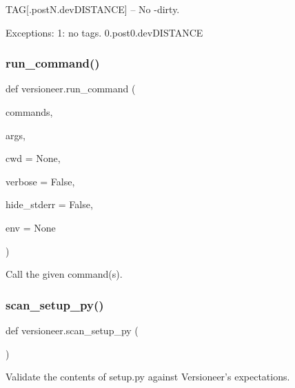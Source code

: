\begin{DoxyVerb}TAG[.postN.devDISTANCE] -- No -dirty.

Exceptions:
1: no tags. 0.post0.devDISTANCE
\end{DoxyVerb}
 \mbox{\label{namespaceversioneer_a89717690f70ee308e16baf071b4b81da}} 
\subsubsection{\texorpdfstring{run\+\_\+command()}{run\_command()}}
{\footnotesize\ttfamily def versioneer.\+run\+\_\+command (\begin{DoxyParamCaption}\item[{}]{commands,  }\item[{}]{args,  }\item[{}]{cwd = {\ttfamily None},  }\item[{}]{verbose = {\ttfamily False},  }\item[{}]{hide\+\_\+stderr = {\ttfamily False},  }\item[{}]{env = {\ttfamily None} }\end{DoxyParamCaption})}

\begin{DoxyVerb}Call the given command(s).\end{DoxyVerb}
 \mbox{\label{namespaceversioneer_ab49eb549b832b1d5cb43fe660f17342d}} 
\subsubsection{\texorpdfstring{scan\+\_\+setup\+\_\+py()}{scan\_setup\_py()}}
{\footnotesize\ttfamily def versioneer.\+scan\+\_\+setup\+\_\+py (\begin{DoxyParamCaption}{ }\end{DoxyParamCaption})}

\begin{DoxyVerb}Validate the contents of setup.py against Versioneer's expectations.\end{DoxyVerb}
 \mbox{\label{namespaceversioneer_a9051a0212036ae5199c90d8d8b9a5710}} 
